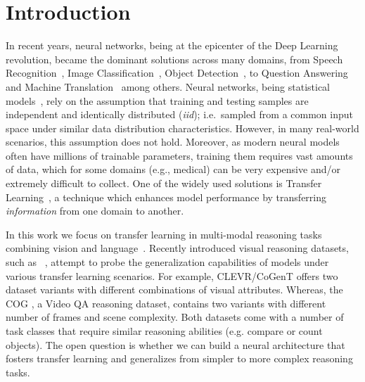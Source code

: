 \section{Introduction}
In recent years, neural networks, being at the epicenter of the Deep Learning~\cite{lecun2015deep} revolution, became the dominant solutions across many domains, from Speech Recognition~\cite{graves2013speech}, Image Classification~\cite{krizhevsky2012imagenet}, Object Detection~\cite{redmon2016you}, to Question Answering~\cite{weston2014memory} and Machine Translation~\cite{bahdanau2014neural} among others.
Neural networks, being statistical models~\cite{ripley1993statistical,warner1996understanding}, rely on the assumption that training and testing samples are independent and identically distributed (\textit{iid}); i.e.\ sampled from a common input space under similar data distribution characteristics.
However, in many real-world scenarios, this assumption does not hold. Moreover, as modern neural models often have millions of trainable parameters, training them requires vast amounts of data, which for some domains (e.g., medical) can be very expensive and/or extremely difficult to collect.
One of the widely used solutions is Transfer Learning~\cite{pan2009survey,weiss2016survey}, a technique which enhances model performance by transferring \emph{information} from one domain to another.


In this work we focus on transfer learning in multi-modal reasoning tasks combining vision and language~\cite{mogadala2019trends}.  Recently introduced visual reasoning datasets, such as ~\cite{johnson2017clevr,yang2018dataset,song2018explore}, attempt to probe the generalization capabilities of models under various transfer learning scenarios. For example, CLEVR/CoGenT \cite{johnson2017clevr} offers two dataset variants with different combinations of visual attributes. Whereas, the COG \cite{yang2018dataset}, a Video QA reasoning dataset, contains two variants with different number of frames and scene complexity.  Both datasets come with a number of task classes that require similar reasoning abilities (e.g. compare or count objects). 
The open question is whether we can build a neural architecture that fosters transfer learning and generalizes from simpler to more complex reasoning tasks.



